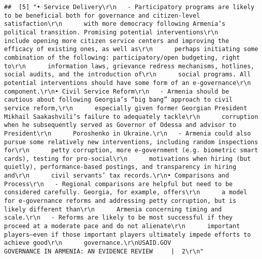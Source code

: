 \documentclass[
]{article}
\begin{document}
\begin{verbatim}
##  [5] "• Service Delivery\r\n   - Participatory programs are likely to be beneficial both for governance and citizen-level satisfaction\r\n      with more democracy following Armenia’s political transition. Promising potential interventions\r\n      include opening more citizen service centers and improving the efficacy of existing ones, as well as\r\n      perhaps initiating some combination of the following: participatory/open budgeting, right to\r\n      information laws, grievance redress mechanisms, hotlines, social audits, and the introduction of\r\n      social programs. All potential interventions should have some form of an e-governance\r\n      component.\r\n• Civil Service Reform\r\n   - Armenia should be cautious about following Georgia’s “big bang” approach to civil service reform,\r\n      especially given former Georgian President Mikhail Saakashvili’s failure to adequately tackle\r\n      corruption when he subsequently served as Governor of Odessa and advisor to President\r\n      Poroshenko in Ukraine.\r\n   - Armenia could also pursue some relatively new interventions, including random inspections for\r\n      petty corruption, more e-government (e.g. biometric smart cards), testing for pro-social\r\n      motivations when hiring (but quietly), performance-based postings, and transparency in hiring and\r\n      civil servants’ tax records.\r\n• Comparisons and Process\r\n   - Regional comparisons are helpful but need to be considered carefully. Georgia, for example, offers\r\n      a model for e-governance reforms and addressing petty corruption, but is likely different than\r\n      Armenia concerning timing and scale.\r\n   - Reforms are likely to be most successful if they proceed at a moderate pace and do not alienate\r\n      important players—even if those important players ultimately impede efforts to achieve good\r\n      governance.\r\nUSAID.GOV                                                GOVERNANCE IN ARMENIA: AN EVIDENCE REVIEW     |  2\r\n"                                                                                                                                                                                                                                                                                                                                                                                                                                                                                                                                                                                                                                                                                                                                                                                                                                                                                                                                                                                                                                                                                                                                                                                                                                                                                                                                                             
\end{verbatim}
\end{document}
